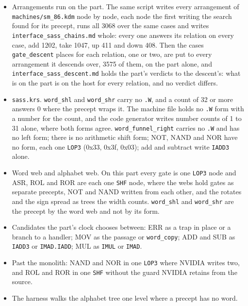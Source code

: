 \begin{enumerate}
\begin{itemize}
\item Arrangements run on the part. The same script writes every arrangement of \texttt{machines/\allowbreak{}sm\_\allowbreak{}86.\allowbreak{}kdm} node by node, each node the first writing the search found for its precept, runs all 3068 over the same cases and writes \texttt{interface\_\allowbreak{}sass\_\allowbreak{}chains.\allowbreak{}md} whole: every one answers its relation on every case, add 1202, take 1047, up 411 and down 408. Then the cases \texttt{gate\_\allowbreak{}descent} places for each relation, one or two, are put to every arrangement it descends over, 3575 of them, on the part alone, and \texttt{interface\_\allowbreak{}sass\_\allowbreak{}descent.\allowbreak{}md} holds the part's verdicts to the descent's: what is on the part is on the host for every relation, and no verdict differs.
\item \texttt{sass.\allowbreak{}krs}. \texttt{word\_\allowbreak{}shl} and \texttt{word\_\allowbreak{}shr} carry no \texttt{.\allowbreak{}W}, and a count of 32 or more answers 0 where the precept wraps it. The machine file holds no \texttt{.\allowbreak{}W} form with a number for the count, and the code generator writes number counts of 1 to 31 alone, where both forms agree. \texttt{word\_\allowbreak{}funnel\_\allowbreak{}right} carries no \texttt{.\allowbreak{}W} and has no left form; there is no arithmetic shift form; NOT, NAND and NOR have no form, each one \texttt{LOP3} (0x33, 0x3f, 0x03); add and subtract write \texttt{IADD3} alone.
\item Word web and alphabet web. On this part every gate is one \texttt{LOP3} node and ASR, ROL and ROR are each one \texttt{SHF} node, where the webs hold gates as separate precepts, NOT and NAND written from each other, and the rotates and the sign spread as trees the width counts. \texttt{word\_\allowbreak{}shl} and \texttt{word\_\allowbreak{}shr} are the precept by the word web and not by its form.
\item Candidates the part's clock chooses between: ERR as a trap in place or a branch to a handler; MOV as the passage or \texttt{word\_\allowbreak{}copy}; ADD and SUB as \texttt{IADD3} or \texttt{IMAD.\allowbreak{}IADD}; MUL as \texttt{IMUL} or \texttt{IMAD}.
\item Past the monolith: NAND and NOR in one \texttt{LOP3} where NVIDIA writes two, and ROL and ROR in one \texttt{SHF} without the guard NVIDIA retains from the source.
\item The harness walks the alphabet tree one level where a precept has no word.

\end{itemize}
\end{enumerate}
